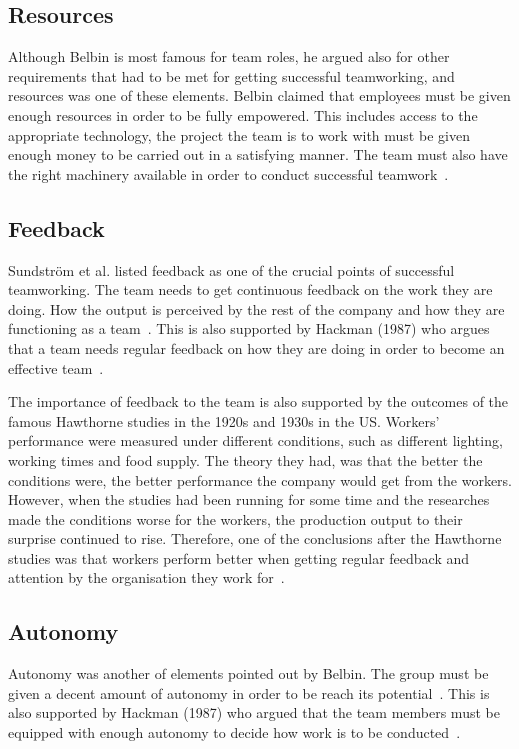 \documentclass[a4paper,12pt,titlepage]{article}
\begin{document}
  \subsection{Resources}
  Although Belbin is most famous for team roles,
  he argued also for other requirements that had to be
  met for getting successful teamworking, and
  resources was one of these elements.
  Belbin claimed that employees must be given enough resources
  in order to be fully empowered. This includes access to the
  appropriate technology, the project the team is to work with
  must be given enough money to be carried out in a satisfying
  manner. The team must also have the right machinery available
  in order to conduct successful teamwork~\cite[263]{ahdb}.

  \subsection{Feedback}
  Sundstr\"{o}m et al. listed feedback as one of the crucial points
  of successful teamworking. The team needs to get continuous feedback
  on the work they are doing. How the output is perceived by
  the rest of the company and how they are functioning as a
  team~\cite[396]{ahdb}. This is also supported by Hackman (1987)
  who argues that a team needs regular feedback on how they are doing
  in order to become an effective team~\cite[375]{ahdb}.

  The importance of feedback to the team is also supported by the
  outcomes of the famous Hawthorne studies in the 1920s and 1930s in
  the US. Workers' performance were measured under different
  conditions, such as different lighting, working times and
  food supply. The theory they had, was that the better
  the conditions were, the better performance the company
  would get from the workers. However,
  when the studies had been running for some time and the researches
  made the conditions worse for the workers, the production output
  to their surprise continued to rise. Therefore, one of the
  conclusions after the Hawthorne studies was that workers
  perform better when getting regular feedback and attention by the
  organisation they work for~\cite[12-3]{rh}.
  
  \subsection{Autonomy}
  Autonomy was another of elements pointed out by Belbin. The group
  must be given a decent amount of autonomy in order to be
  reach its potential~\cite[263]{ahdb}. This is also supported by
  Hackman (1987) who argued that the team members must be equipped
  with enough autonomy to decide how work is to be
  conducted~\cite[375]{ahdb}.
\end{document}
